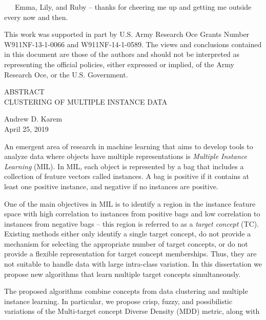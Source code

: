 \documentclass[12pt,dvips]{report}
\numberwithin{equation}{section}
\begin{document}
\ \ \ Emma, Lily, and Ruby -- thanks for cheering me up and getting me outside every now and then.

\vfill
\begin{tiny}
\begin{singlespace}
This work was supported in part by U.S. Army Research Oce Grants Number W911NF-13-1-0066 and W911NF-14-1-0589. The views and conclusions contained in this document are those of the authors and should not be interpreted as representing the official policies, either expressed or implied, of the Army Research Oce, or the U.S. Government.
\end{singlespace}
\end{tiny}


\pagebreak

\begin{center}

ABSTRACT \\
CLUSTERING OF MULTIPLE INSTANCE DATA


Andrew D. Karem \\


April 25, 2019 %

\end{center}

An emergent area of research in machine learning that aims to develop tools to analyze data where objects have multiple representations is \emph{Multiple Instance Learning} (MIL).  In MIL, each object is represented by a bag that includes a collection of feature vectors called instances.  A bag is positive if it contains at least one positive instance, and negative if no instances are positive.

One of the main objectives in MIL is to identify a region in the instance feature space with high correlation to instances from positive bags and low correlation to instances from negative bags -- this region is referred to as a \emph{target concept} (TC).  Existing methods either only identify a single target concept, do not provide a mechanism for selecting the appropriate number of target concepts, or do not provide a flexible representation for target concept memberships.  Thus, they are not suitable to handle data with large intra-class variation.  In this dissertation we propose new algorithms that learn multiple target concepts simultaneously.

The proposed algorithms combine concepts from data clustering and multiple instance learning.  In particular, we propose crisp, fuzzy, and possibilistic variations of the Multi-target concept Diverse Density (MDD) metric, along with \pagebreak
\end{document}
